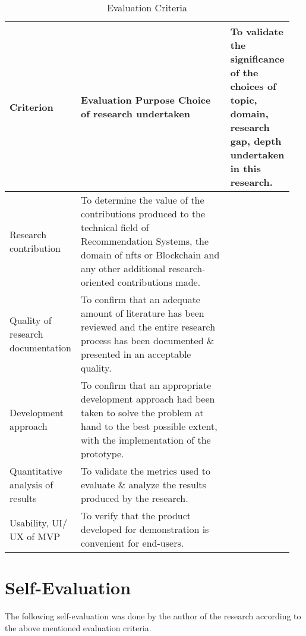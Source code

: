 \vspace{-4mm}
\begin{longtable}{|p{0.22\linewidth}|p{0.726\linewidth}|}
\caption{Evaluation Criteria}\\ 
\hline
\textbf{Criterion} & \textbf{Evaluation Purpose} \endfirsthead 
\hline
Choice of research undertaken & To validate the significance of the choices of topic, domain, research gap, depth undertaken in this research. \\ 
\hline
Research contribution & To determine the value of the contributions produced to the technical field of Recommendation Systems, the domain of \gls{nft}s or Blockchain and any other additional research-oriented contributions made. \\ 
\hline
Quality of research documentation & To confirm that an adequate amount of literature has been reviewed and the entire research process has been documented \& presented in an acceptable quality. \\ 
\hline
Development approach & To confirm that an appropriate development approach had been taken to solve the problem at hand to the best possible extent, with the implementation of the prototype.\\ 
\hline
Quantitative analysis of results & To validate the metrics used to evaluate \& analyze the results produced by the research. \\ 
\hline
Usability, UI/ UX of MVP &
To verify that the product developed for demonstration is convenient for end-users. \\
\hline
\end{longtable}

\section{Self-Evaluation}

The following self-evaluation was done by the author of the research according to the above mentioned evaluation criteria.

